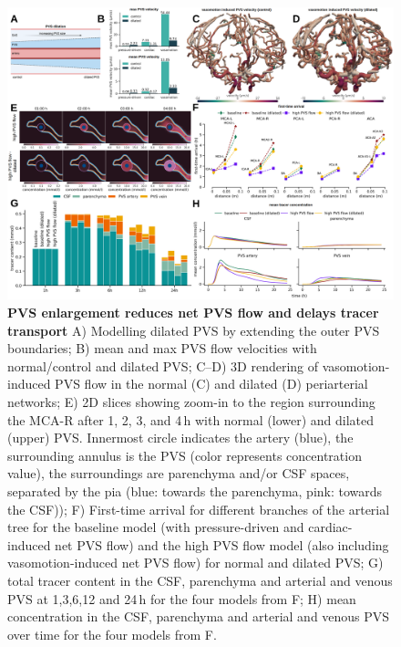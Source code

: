 \documentclass[fleqn,10pt]{wlscirep}
\newcommand{\mer}[1]{\textcolor{magenta}{#1}}
\begin{document}
\begin{figure}
    \centering
    \includegraphics[width=1 \textwidth]{figures/figure5.png}
    \caption{\textbf{PVS enlargement reduces net PVS flow and delays tracer transport}
    A) Modelling dilated PVS by extending the outer PVS boundaries;
    B) mean and max PVS flow velocities with normal/control and dilated PVS;
    C--D) 3D rendering of vasomotion-induced PVS flow in the normal (C) and dilated (D) periarterial networks; 
    E) 2D slices showing zoom-in to the region surrounding the MCA-R after 1, 2, 3, and 4\,h with normal (lower) and dilated (upper) PVS. Innermost circle indicates the artery (blue), the surrounding annulus is the PVS (color represents concentration value), the surroundings are parenchyma and/or CSF spaces, separated by the pia (blue: towards the parenchyma, pink: towards the CSF)); 
    F) First-time arrival for different branches of the arterial tree for the baseline model (with pressure-driven and cardiac-induced net PVS flow) and the high PVS flow model (also including vasomotion-induced net PVS flow) for normal and dilated PVS;
    G) total tracer content in the CSF, parenchyma and arterial and venous PVS at 1,3,6,12 and 24\,h for the four models from F;
    H) mean concentration in the CSF, parenchyma and arterial and venous PVS over time for the four models from F.
    }
    \label{fig:enlargement}
\end{figure}

\end{document}
